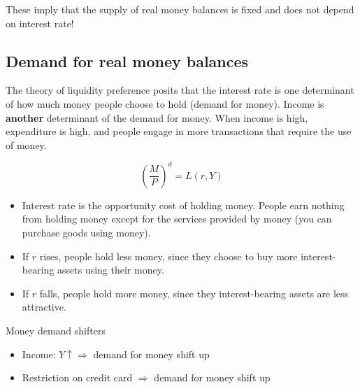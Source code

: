 \documentclass[10pt]{article}
\begin{document}
These imply that the supply of real money balances is fixed and does not depend on
interest rate!

\begin{figure}[H]
\end{figure}




\subsection{Demand for real money balances}
The theory of liquidity preference posits that the interest rate is one determinant of
how much money people choose to hold (demand for money).
Income is {\textbf {another}} determinant of the demand for money.
When income is high, expenditure is high, and people engage in more transactions that
require the use of money.

\begin{equation*}
\left( \frac{M}{P} \right) ^{d} = L(r, Y)
\end{equation*}


\begin{itemize}
\item Interest rate is the opportunity cost of holding money. People earn nothing from
		holding money except for the services provided by money (you can purchase goods using
		money).
\item If $ r $ rises, people hold less money, since they choose to buy more interest-
		bearing assets using their money.
\item If $ r $ falls, people hold more money, since they  interest-bearing assets are
		less attractive.
\end{itemize}



Money demand shifters
\begin{itemize}
\item Income: $ Y \uparrow  \Longrightarrow$ demand for money shift up
\item Restriction on credit card $ \Longrightarrow $ demand for money shift up
\end{itemize}
\end{document}
